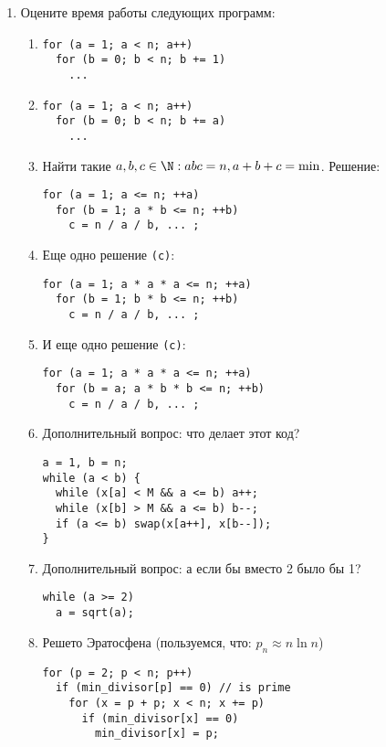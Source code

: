 \begin{enumerate}
  \item
    Оцените время работы следующих программ:
    \begin{enumerate}
      \item
\begin{lstlisting}
for (a = 1; a < n; a++)
  for (b = 0; b < n; b += 1)
    ...
\end{lstlisting}

      \item
\begin{lstlisting}
for (a = 1; a < n; a++)
  for (b = 0; b < n; b += a)
    ...
\end{lstlisting}

      \item Найти такие $a, b, c \in \N: a b c = n, a+b+c = \min$. Решение:
\begin{lstlisting}
for (a = 1; a <= n; ++a)
  for (b = 1; a * b <= n; ++b)
    c = n / a / b, ... ;
\end{lstlisting}

      \item Еще одно решение \texttt{(c)}:
\begin{lstlisting}
for (a = 1; a * a * a <= n; ++a)
  for (b = 1; b * b <= n; ++b)
    c = n / a / b, ... ;
\end{lstlisting}

      \item И еще одно решение \texttt{(c)}:
\begin{lstlisting}
for (a = 1; a * a * a <= n; ++a)
  for (b = a; a * b * b <= n; ++b)
    c = n / a / b, ... ;
\end{lstlisting}

      \item Дополнительный вопрос: что делает этот код?
\begin{lstlisting}
a = 1, b = n;
while (a < b) {
  while (x[a] < M && a <= b) a++;
  while (x[b] > M && a <= b) b--;
  if (a <= b) swap(x[a++], x[b--]);
}
\end{lstlisting}

      \item Дополнительный вопрос: а если бы вместо 2 было бы 1?
\begin{lstlisting}
while (a >= 2)
  a = sqrt(a);
\end{lstlisting}

      \item Решето Эратосфена (пользуемся, что: $p_n \approx n \ln n$)
	\begin{lstlisting}
for (p = 2; p < n; p++)
  if (min_divisor[p] == 0) // is prime
    for (x = p + p; x < n; x += p)
      if (min_divisor[x] == 0)
        min_divisor[x] = p;
	\end{lstlisting}
	    \end{enumerate}


\end{enumerate}
